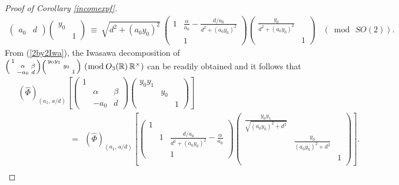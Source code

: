 \documentclass[11pt,reqno]{amsart}
\theoremstyle{definition}
\theoremstyle{definition}
\theoremstyle{remark}
\newcommand{\R}{\ensuremath{\mathbb{R}}}
\numberwithin{equation}{section}
\begin{document}
\begin{proof}[Proof of Corollary \ref{incomexpf}]
\begin{align}
\begin{pmatrix}
	a_{0}   & d
\end{pmatrix}
\begin{pmatrix}
	y_{0} & \\
	& 1
\end{pmatrix} \ \equiv \  \sqrt{d^{2}+(a_{0}y_{0})^2} \  \begin{pmatrix}
1 & \frac{\alpha}{a_{0}}- \frac{d/a_{0}}{d^2+(a_{0}y_{0})^2} \\
  & 1
\end{pmatrix}
\begin{pmatrix}
	\frac{y_{0}}{d^2+(a_{0}y_{0})^2} & \\
	 & 1
\end{pmatrix} \hspace{10pt} (\bmod\, SO(2)). 
\end{align}
 From (\ref{2by2Iwa}), the Iwasawa 	decomposition of\,  $\begin{psmallmatrix}
 	1 &            &         \\
 	& \alpha & \beta \\
 	& -a_{0} & d
 \end{psmallmatrix}
 \begin{psmallmatrix}
 	y_{0}y_{1}&  & \\
 	& y_{0} & \\
 	&           & 1
 \end{psmallmatrix} \ (\bmod\, O_{3}(\R) \, \R^{\times})$ can be readily obtained and it follows that 
\begin{align}\label{centralmaid}
\hspace{5pt} 	&	\left(\widehat{\Phi}\right)_{(a_{1}, \, a/d)}  \left[\begin{pmatrix}
		1 &            &         \\
		& \alpha & \beta \\
		& -a_{0} & d
	\end{pmatrix}
	\begin{pmatrix}
		y_{0}y_{1}&  & \\
		& y_{0} & \\
		&           & 1
	\end{pmatrix}\right] \nonumber\\[0.1in] 
	& \hspace{70pt}  \ \ = \  \  	\left(\widehat{\Phi}\right)_{(a_{1},\,  a/d)}\left[ \begin{pmatrix}
	1 &     &    \\
	& 1  & \frac{d/a_{0}}{d^2+(a_{0}y_{0})^2} - \frac{\alpha}{a_{0}}\\
	&     &    1
	\end{pmatrix} \begin{pmatrix}
	\frac{y_{0} y_{1}}{\sqrt{(a_{0}y_{0})^2+d^2}} &  &  \\
	& \frac{y_{0}}{(a_{0} y_{0})^2+d^2} &  \\
	&  & 1 \\
	\end{pmatrix}\right]. \nonumber\\
\end{align}





\end{proof}
\end{document}
